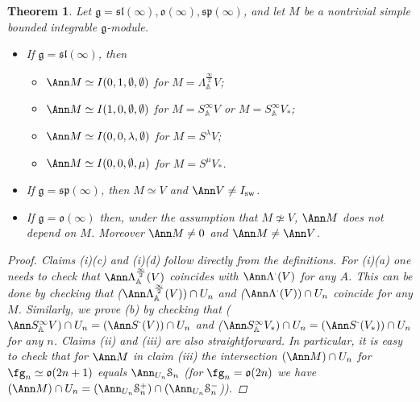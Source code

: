 \documentclass[12pt]{amsart}
\def\gg{\mathfrak{g}}
\def\go{\mathfrak{o}}
\newtheorem{thm}{Theorem}[section]
\begin{document}
\begin{thm} Let $\gg = \mathfrak{sl} (\infty), \mathfrak{o} (\infty), \mathfrak{sp} (\infty)$, and let 
 $M$ be a nontrivial simple bounded integrable $\gg$-module.

\begin{itemize}
\item[(i)] If $\gg = \mathfrak{sl} (\infty)$, then
\begin{itemize}
\item[(a)] $\Ann M \simeq I(0,1,\emptyset, \emptyset)$ for $M = \Lambda_{\mathbb A}^{\frac{\infty}{2}}  V$;
\item[(b)] $\Ann M \simeq I(1,0,\emptyset, \emptyset)$ for $M = S_{\mathbb A}^{\infty}  V$ or $M = S_{\mathbb A}^{\infty} V_*$;
\item[(c)] $\Ann M \simeq I(0,0,\lambda, \emptyset)$ for $M = S^{\lambda} V$;
\item[(d)] $\Ann M \simeq I(0,0,\emptyset, \mu)$ for $M = S^{\mu} V_*$.
\end{itemize}
\item[(ii)] If $\gg = \mathfrak{sp} (\infty)$, then $M \simeq  V$ and 
$ \Ann  V\neq I_{\rm sw}$. 
\item[(iii)] If $\gg = \mathfrak{o} (\infty)$ then,  under the assumption that $M\not\simeq V$, $\Ann M$ does not depend on $M$. Moreover $\Ann M\neq 0$ and $\Ann M\neq \Ann V$.
\end{itemize}
\begin{proof}
Claims  (i)(c) and (i)(d) follow directly from the definitions. For (i)(a) one needs to check that $\Ann \Lambda^{\frac{\infty}{2}}_{\mathbb A}(V)$ coincides with $\Ann \Lambda^\cdot(V)$ for any $A$. This can be done by checking that ($\Ann \Lambda^{\frac{\infty}{2}}_{\mathbb A}(V))\cap U_n$ and ($\Ann \Lambda^{\cdot}(V))\cap U_n$ coincide for any $M$. Similarly, we prove (b) by checking that ($\Ann S_{\mathbb A}^{\infty}  V)\cap U_n=(\Ann S^{\cdot}(V))\cap U_n$ and ($\Ann S_{\mathbb A}^{\infty}  V_*)\cap U_n=(\Ann S^{\cdot}(V_*))\cap U_n$  for any $n$. Claims (ii) and (iii) are also straightforward. In particular, it is easy to check that for $\Ann M$ in claim (iii) the intersection $(\Ann M)\cap U_n$   for $\fg_n\simeq \go(2n+1)$ equals $\Ann_{U_n}\mathcal{S}_n$ (for $\fg_n=\go(2n)$ we have $(\Ann M)\cap U_n=(\Ann_{U_n}\mathcal{S}^+_n)\cap(\Ann_{U_n}\mathcal{S}^-_n$)).
\end{proof}




\end{thm}
\end{document}
